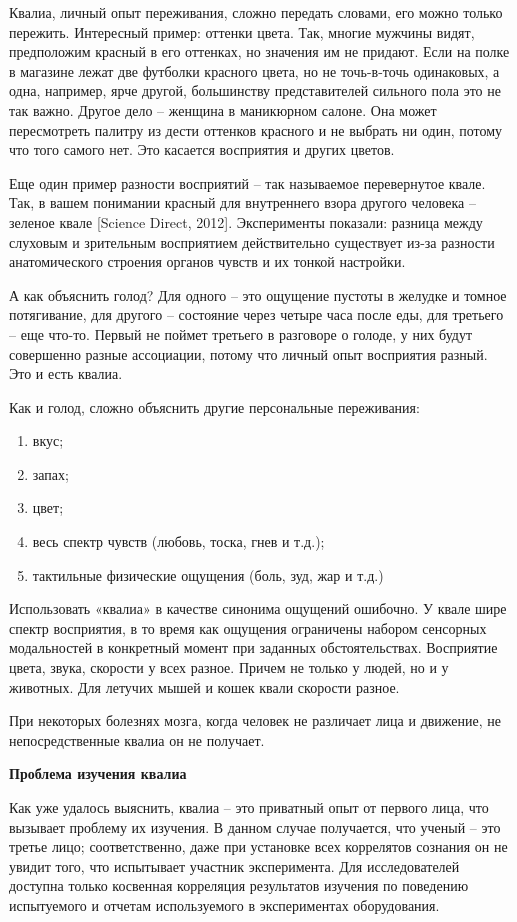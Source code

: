 Квалиа, личный опыт переживания, сложно передать словами, его можно только пережить. Интересный пример: оттенки цвета. Так, многие мужчины видят, предположим красный в его оттенках, но значения им не придают. Если на полке в магазине лежат две футболки красного цвета, но не точь-в-точь одинаковых, а одна, например, ярче другой, большинству представителей сильного пола это не так важно. Другое дело – женщина в маникюрном салоне. Она может пересмотреть палитру из дести оттенков красного и не выбрать ни один, потому что того самого нет. Это касается восприятия и других цветов.

Еще один пример разности восприятий – так называемое перевернутое квале. Так, в вашем понимании красный для внутреннего взора другого человека – зеленое квале [Science Direct, 2012]. Эксперименты показали: разница между слуховым и зрительным восприятием действительно существует из-за разности анатомического строения органов чувств и их тонкой настройки.

А как объяснить голод? Для одного – это ощущение пустоты в желудке и томное потягивание, для другого – состояние через четыре часа после еды, для третьего – еще что-то. Первый не поймет третьего в разговоре о голоде, у них будут совершенно разные ассоциации, потому что личный опыт восприятия разный. Это и есть квалиа.

Как и голод, сложно объяснить другие персональные переживания:
\begin{enumerate}
    \item вкус;
    \item запах;
    \item цвет;
    \item весь спектр чувств (любовь, тоска, гнев и т.д.);
    \item тактильные физические ощущения (боль, зуд, жар и т.д.)
\end{enumerate}

Использовать «квалиа» в качестве синонима ощущений ошибочно. У квале шире спектр восприятия, в то время как ощущения ограничены набором сенсорных модальностей в конкретный момент при заданных обстоятельствах. Восприятие цвета, звука, скорости у всех разное. Причем не только у людей, но и у животных. Для летучих мышей и кошек квали скорости разное.

При некоторых болезнях мозга, когда человек не различает лица и движение, не непосредственные квалиа он не получает.


\textbf{Проблема изучения квалиа}

Как уже удалось выяснить, квалиа – это приватный опыт от первого лица, что вызывает проблему их изучения. В данном случае получается, что ученый – это третье лицо; соответственно, даже при установке всех коррелятов сознания он не увидит того, что испытывает участник эксперимента. Для исследователей доступна только косвенная корреляция результатов изучения по поведению испытуемого и отчетам используемого в экспериментах оборудования.

